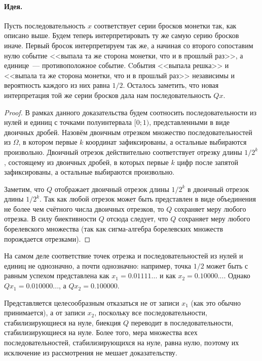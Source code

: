 \paragraph{Идея.}
	Пусть последовательность $x$ соответствует серии бросков монетки так, как описано выше.
	Будем теперь интерпретировать ту же самую серию бросков иначе.
	Первый бросок интерпретируем так же,
	а начиная со второго сопоставим нулю событие <<выпала та же сторона монетки, что и в прошлый раз>>,
	а единице~--- противоположное событие.
	Cобытия <<выпала решка>> и <<выпала та же сторона монетки, что и в прошлый раз>> независимы
	и вероятность каждого из них равна $1/2$.
	Осталось заметить, что новая интерпретация той же серии бросков дала нам последовательность $Qx$.
\begin{proof}
	В рамках данного доказательства будем соотносить последовательности из нулей и единиц
	с точками полуинтервала $[0;1)$, представленными в виде двоичных дробей.
	Назовём двоичным отрезком множество последовательностей из $\Omega$,
	в котором первые $k$ координат зафиксированы, а остальные выбираются произвольно.
	Двоичный отрезок действительно соответствует отрезку длины $1/2^k$,
	состоящему из двоичных дробей, в которых первые $k$ цифр после запятой зафиксированы,
	а остальные выбираются произвольно.

	Заметим, что $Q$ отображает двоичный отрезок длины $1/2^k$ в двоичный отрезок длины $1/2^k$.
	Так как любой отрезок может быть представлен в виде объединения не более чем счётного числа
	двоичных отрезков, то $Q$ сохраняет меру любого отрезка.
	В силу биективности $Q$ отсюда следует, что $Q$ сохраняет меру любого борелевского множества
	(так как сигма-алгебра борелевских множеств порождается отрезками).
\end{proof}

\begin{remark}
	На самом деле соответствие точек отрезка и последовательностей из нулей и единиц не однозначно,
	а почти однозначно: например, точка $1/2$ может быть с равным успехом
	представлена как $x_1=0.01111...$ и как $x_2=0.10000...$.
	Однако $Qx_1 = 0.010000...$, а $Qx_2=0.100000$.



	Представляется целесообразным отказаться не от записи $x_1$ (как это обычно принимается),
	а от записи $x_2$, поскольку все последовательности, стабилизирующиеся на нуле,
	биекция $Q$ переводит в последовательности, стабилизирующиеся на нуле.
	Более того, мера множества всех последовательностей, стабилизирующихся на нуле, равна нулю,
	поэтому их исключение из рассмотрения не мешает доказательству.
\end{remark}

